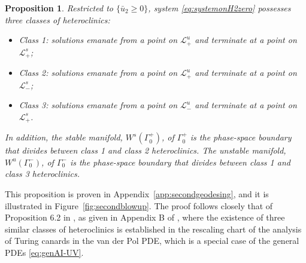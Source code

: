 \documentclass[11pt]{article}
\numberwithin{equation}{section}
\newtheorem{proposition}{Proposition}[section]
\begin{document}
\begin{proposition}\label{prop:roleofGamma20}
Restricted to $\{ \bar{u}_2  \ge 0 \}$, system \eqref{eq:systemonH2zero} possesses three classes of heteroclinics:
\begin{itemize}
\setlength{\itemsep}{0pt}
    \item Class 1: solutions emanate from a point on $\mathcal{L}_+^u$ and terminate at a point on $\mathcal{L}_+^s$;
     \item Class 2: solutions emanate from a point on $\mathcal{L}_+^u$ and terminate at a point on $\mathcal{L}_-^s$;
     \item Class 3: solutions emanate from a point on $\mathcal{L}_-^u$ and terminate at a point on $\mathcal{L}_+^s$.
     \end{itemize}
     \noindent 
In addition, the stable manifold, $W^s(\Gamma_{0}^+)$, of $\Gamma_{0}^+$ is the phase-space boundary that divides between class 1 and class 2 heteroclinics.
The unstable manifold, $W^u(\Gamma_{0}^-)$, of $\Gamma_{0}^-$ is the phase-space boundary that divides between class 1 and class 3 heteroclinics. 
\end{proposition}
%
\noindent 
This proposition is proven in Appendix~\ref{app:secondgeodesing}, and it is illustrated in Figure~\ref{fig:secondblowup}. 
The proof follows closely that of Proposition 6.2 in \cite{VDK2025}, as given in Appendix B of \cite{VDK2025}, where the existence of three similar classes of heteroclinics is established in the rescaling chart of the analysis of Turing canards in the van der Pol PDE, which is a special case of the general PDEs \eqref{eq:genAI-UV}.
\end{document}
